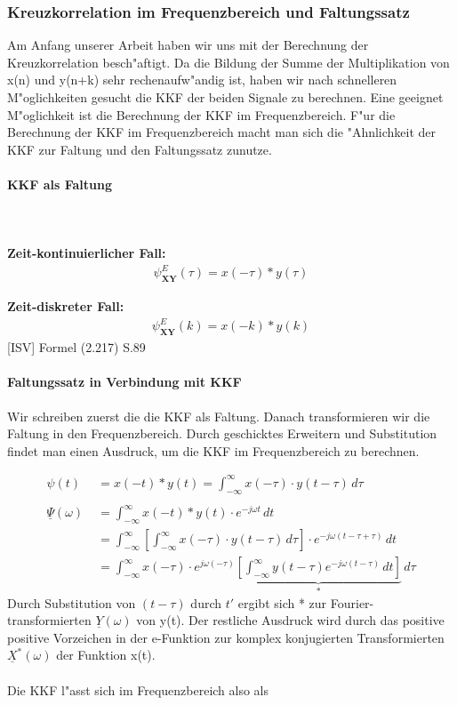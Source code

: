 \subsubsection{Kreuzkorrelation im Frequenzbereich und Faltungssatz}
Am Anfang unserer Arbeit haben wir uns mit der Berechnung der Kreuzkorrelation besch"aftigt. Da die Bildung der Summe der Multiplikation von x(n) und y(n+k) sehr rechenaufw"andig ist, haben wir nach schnelleren M"oglichkeiten gesucht die KKF der beiden Signale zu berechnen. Eine geeignet M"oglichkeit ist die Berechnung der KKF im Frequenzbereich. F"ur die Berechnung der KKF im Frequenzbereich macht man sich die "Ahnlichkeit der KKF zur Faltung und den Faltungssatz zunutze.

\paragraph{KKF als Faltung}
\textbf{\\\\Zeit-kontinuierlicher Fall:}
\begin{align}
\psi_{\textbf {XY}}^E(\tau) = x(-\tau) * y(\tau)
\end{align}

\textbf{Zeit-diskreter Fall:}
\begin{align}
\psi_{\textbf {XY}}^E(k) = x(-k) * y(k)
\end{align}
[ISV] Formel (2.217) S.89

\paragraph{Faltungssatz in Verbindung mit KKF}

Wir schreiben zuerst die die KKF als Faltung. Danach transformieren wir die Faltung in den Frequenzbereich. Durch geschicktes Erweitern und Substitution findet man einen Ausdruck, um die KKF im Frequenzbereich zu berechnen.

\begin{align}
\psi(t) \  \; &= x(-t) * y(t) = \int_{-\infty}^{\infty} x(-\tau) \cdot y(t-\tau)\,d\tau\\\\
\underline \Psi(\omega) &=\int_{-\infty}^{\infty} x(-t) * y(t) \cdot e^{-j\omega t} \,dt\\&=\int_{-\infty}^{\infty} \left[ \int_{-\infty}^{\infty} x(-\tau) \cdot y(t-\tau)\,d\tau \right] \cdot e^{-j\omega (t - \tau + \tau)} \,dt\\&=\int_{-\infty}^{\infty} x(-\tau) \cdot e^{j\omega(-\tau)} \underbrace{ \left[ \int_{-\infty}^{\infty} y(t-\tau) e^{-j\omega (t - \tau)} \,dt \right]}_* \,d\tau
\end{align}
Durch Substitution von $(t-\tau)$ durch $t'$ ergibt sich * zur Fourier-transformierten $ \underline{Y}(\omega)$ von y(t). Der restliche Ausdruck wird durch das positive positive Vorzeichen in der e-Funktion zur komplex konjugierten Transformierten $ \underline{X}^*(\omega)$ der Funktion x(t).
\\\\
Die KKF l"asst sich im Frequenzbereich also als

